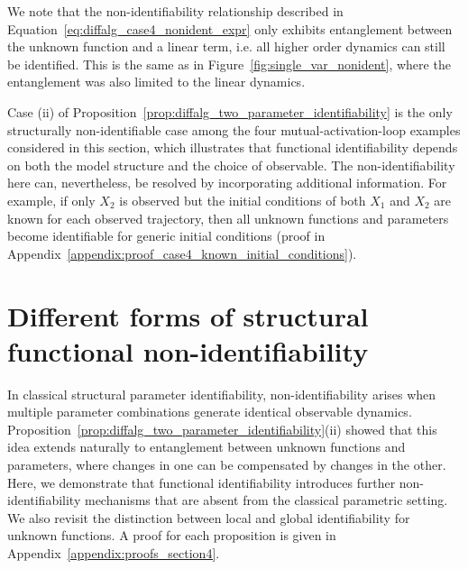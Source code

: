 \documentclass{article}
\theoremstyle{plain}
\theoremstyle{definition}
\begin{document}
{We note that the non-identifiability relationship described in Equation~\eqref{eq:diffalg_case4_nonident_expr} only exhibits entanglement between the unknown function and a linear term, i.e. all higher order dynamics can still be identified. This is the same as in Figure~\ref{fig:single_var_nonident}, where the entanglement was also limited to the linear dynamics.

Case (ii) of Proposition~\ref{prop:diffalg_two_parameter_identifiability} is the only structurally non-identifiable case among the four mutual-activation-loop examples considered in this section, which illustrates that functional identifiability depends on both the model structure and the choice of observable. The non-identifiability here can, nevertheless, be resolved by incorporating additional information. For example, if only $X_2$ is observed but the initial conditions of both $X_1$ and $X_2$ are known for each observed trajectory, then all unknown functions and parameters become identifiable for generic initial conditions (proof in Appendix~\ref{appendix:proof_case4_known_initial_conditions}). 


\section{Different forms of structural functional non-identifiability} \label{sec:nonidentifiability_types}

In classical structural parameter identifiability, non-identifiability arises when multiple parameter combinations generate identical observable dynamics. Proposition~\ref{prop:diffalg_two_parameter_identifiability}(ii) showed that this idea extends naturally to entanglement between unknown functions and parameters, where changes in one can be compensated by changes in the other. Here, we demonstrate that functional identifiability introduces further non-identifiability mechanisms that are absent from the classical parametric setting. We also revisit the distinction between local and global identifiability for unknown functions. A proof for each proposition is given in Appendix~\ref{appendix:proofs_section4}.

}
\end{document}
